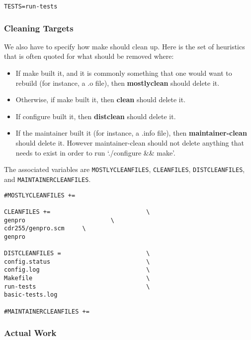 \documentclass[11pt]{article}
\begin{document}
\begin{verbatim}
TESTS=run-tests
\end{verbatim}
\subsubsection{Cleaning Targets}
\label{sec:org07460b5}
We also have to specify how make should clean up. Here is the set of heuristics
that is often quoted for what should be removed where:

\begin{itemize}
\item If make built it, and it is commonly something that one would want to
rebuild (for instance, a .o file), then \textbf{mostlyclean} should delete it.
\item Otherwise, if make built it, then \textbf{clean} should delete it.
\item If configure built it, then \textbf{distclean} should delete it.
\item If the maintainer built it (for instance, a .info file), then
\textbf{maintainer-clean} should delete it. However maintainer-clean should not
delete anything that needs to exist in order to run ‘./configure \&\& make’.
\end{itemize}


The associated variables are \texttt{MOSTLYCLEANFILES}, \texttt{CLEANFILES}, \texttt{DISTCLEANFILES},
and \texttt{MAINTAINERCLEANFILES}.
\begin{verbatim}
#MOSTLYCLEANFILES +=                    

CLEANFILES +=                           \
genpro                        \
cdr255/genpro.scm     \
genpro

DISTCLEANFILES =                        \
config.status                           \
config.log                              \
Makefile                                \
run-tests                               \
basic-tests.log

#MAINTAINERCLEANFILES +=                 

\end{verbatim}
\subsubsection{Actual Work}
\label{sec:org47802fb}
\end{document}
